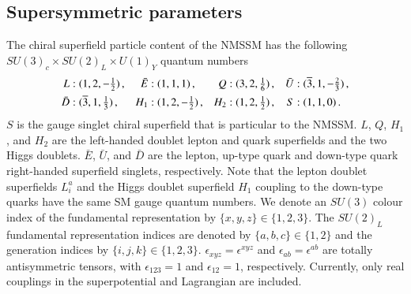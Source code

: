 \documentclass[final,3p,times,pdflatex]{elsarticle}
\begin{document}
\subsection{Supersymmetric parameters \label{susypars}}
The chiral superfield particle content of the NMSSM has the 
following $SU(3)_c\times SU(2)_L\times U(1)_Y$ quantum numbers
\begin{align}
L&:(1,2,-\tfrac{1}{2})\,, & \bar{E}&:(1,1,1)\,, & 
Q&:(3,2,\tfrac{1}{6})\,,  & \bar{U}&:(\overline 3,1,-\tfrac{2}{3})\,, \notag \\
\bar{D}&:(\overline 3,1,\tfrac{1}{3})\,, & H_1&:(1,2,-\tfrac{1}{2})\,, & 
H_2&:(1,2,\tfrac{1}{2})\,, & S&:(1,1,0)\,.
\label{fields}
\end{align}
$S$ is the gauge singlet chiral superfield that is particular to the NMSSM. 
$L$, $Q$, $H_1$, and $H_2$ are the left-handed doublet lepton and quark 
superfields and the two Higgs doublets. $\bar{E}$, $\bar{U}$, and $\bar{D}$ are 
the lepton, up-type quark and down-type quark right-handed superfield singlets, 
respectively. Note that the lepton doublet superfields $L^a_i$ and the Higgs 
doublet superfield $H_1$ coupling to the down-type quarks have the same 
SM gauge quantum numbers. We denote an $SU(3)$ colour 
index of the fundamental representation by  $\{x,y,z\} \in \{1,2,3 \}$. The 
$SU(2)_L$ fundamental representation indices are denoted by 
$\{a,b,c\} \in \{1,2\}$ and the generation indices by $\{i,j,k\} \in \{1,2,3\}$.
 $\epsilon_{xyz}=\epsilon^{xyz}$ and  $\epsilon_{ab}=\epsilon^{ab}$ are totally
antisymmetric tensors, with $\epsilon_{123}=1$ and $\epsilon_{12}=1$, 
respectively.  Currently, only real couplings in the superpotential and Lagrangian are 
included. 
\end{document}
